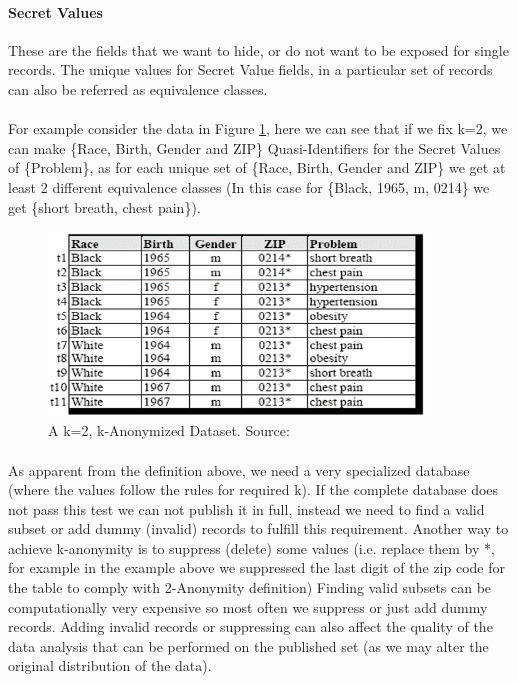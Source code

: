 \documentclass{report}
\begin{document}
\paragraph{Secret Values}
These are the fields that we want to hide, or do not want to be exposed for single records. The unique values for Secret Value fields, in a particular set of records can also be referred as equivalence classes.

\paragraph{}
For example consider the data in Figure \ref{fig:kAon=2}, here we can see that if we fix k=2, we can make \{Race, Birth, Gender and ZIP\} Quasi-Identifiers for the Secret Values of \{Problem\}, as for each unique set of \{Race, Birth, Gender and ZIP\} we get at least 2 different equivalence classes (In this case for \{Black, 1965, m, 0214\} we get \{short breath, chest pain\}).
\begin{figure}[ht]
\centering
        \includegraphics[width=100mm,scale=0.5]{Images/k2Diversified.png}
    \caption{A k=2, k-Anonymized Dataset. Source:\cite{sweeney2002k}}
    \label{fig:kAon=2}
\end{figure}

\paragraph{}
As apparent from the definition above, we need a very specialized database (where the values follow the rules for required k). If the complete database does not pass this test we can not publish it in full, instead we need to find a valid subset or add dummy (invalid) records to fulfill this requirement. Another way to achieve k-anonymity is to suppress (delete) some values (i.e. replace them by *, for example in the example above we suppressed the last digit of the zip code for the table to comply with 2-Anonymity definition) Finding valid subsets can be computationally very expensive so most often we suppress or just add dummy records. Adding invalid records or suppressing can also affect the quality of the data analysis that can be performed on the published set (as we may alter the original distribution of the data).
\end{document}
